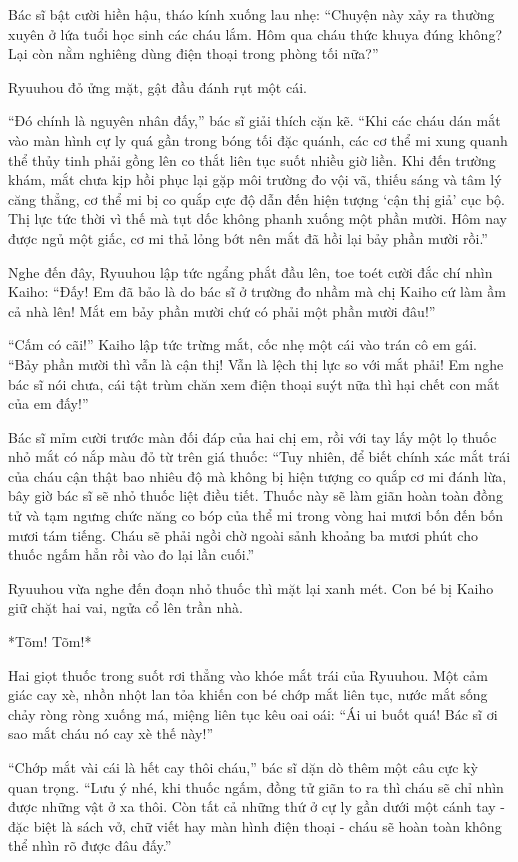 ﻿\documentclass[../main.tex]{subfiles}
\begin{document}
Bác sĩ bật cười hiền hậu, tháo kính xuống lau nhẹ: ``Chuyện này xảy ra thường xuyên ở lứa tuổi học sinh các cháu lắm. Hôm qua cháu thức khuya đúng không? Lại còn nằm nghiêng dùng điện thoại trong phòng tối nữa?''

Ryuuhou đỏ ửng mặt, gật đầu đánh rụt một cái.

``Đó chính là nguyên nhân đấy,'' bác sĩ giải thích cặn kẽ. ``Khi các cháu dán mắt vào màn hình cự ly quá gần trong bóng tối đặc quánh, các cơ thể mi xung quanh thể thủy tinh phải gồng lên co thắt liên tục suốt nhiều giờ liền. Khi đến trường khám, mắt chưa kịp hồi phục lại gặp môi trường đo vội vã, thiếu sáng và tâm lý căng thẳng, cơ thể mi bị co quắp cực độ dẫn đến hiện tượng `cận thị giả' cục bộ. Thị lực tức thời vì thế mà tụt dốc không phanh xuống một phần mười. Hôm nay được ngủ một giấc, cơ mi thả lỏng bớt nên mắt đã hồi lại bảy phần mười rồi.''

Nghe đến đây, Ryuuhou lập tức ngẩng phắt đầu lên, toe toét cười đắc chí nhìn Kaiho: ``Đấy! Em đã bảo là do bác sĩ ở trường đo nhầm mà chị Kaiho cứ làm ầm cả nhà lên! Mắt em bảy phần mười chứ có phải một phần mười đâu!''

``Cấm có cãi!'' Kaiho lập tức trừng mắt, cốc nhẹ một cái vào trán cô em gái. ``Bảy phần mười thì vẫn là cận thị! Vẫn là lệch thị lực so với mắt phải! Em nghe bác sĩ nói chưa, cái tật trùm chăn xem điện thoại suýt nữa thì hại chết con mắt của em đấy!''

Bác sĩ mỉm cười trước màn đối đáp của hai chị em, rồi với tay lấy một lọ thuốc nhỏ mắt có nắp màu đỏ từ trên giá thuốc: ``Tuy nhiên, để biết chính xác mắt trái của cháu cận thật bao nhiêu độ mà không bị hiện tượng co quắp cơ mi đánh lừa, bây giờ bác sĩ sẽ nhỏ thuốc liệt điều tiết. Thuốc này sẽ làm giãn hoàn toàn đồng tử và tạm ngưng chức năng co bóp của thể mi trong vòng hai mươi bốn đến bốn mươi tám tiếng. Cháu sẽ phải ngồi chờ ngoài sảnh khoảng ba mươi phút cho thuốc ngấm hẳn rồi vào đo lại lần cuối.''

Ryuuhou vừa nghe đến đoạn nhỏ thuốc thì mặt lại xanh mét. Con bé bị Kaiho giữ chặt hai vai, ngửa cổ lên trần nhà.

*Tõm! Tõm!*

Hai giọt thuốc trong suốt rơi thẳng vào khóe mắt trái của Ryuuhou. Một cảm giác cay xè, nhồn nhột lan tỏa khiến con bé chớp mắt liên tục, nước mắt sống chảy ròng ròng xuống má, miệng liên tục kêu oai oái: ``Ái ui buốt quá! Bác sĩ ơi sao mắt cháu nó cay xè thế này!''

``Chớp mắt vài cái là hết cay thôi cháu,'' bác sĩ dặn dò thêm một câu cực kỳ quan trọng. ``Lưu ý nhé, khi thuốc ngấm, đồng tử giãn to ra thì cháu sẽ chỉ nhìn được những vật ở xa thôi. Còn tất cả những thứ ở cự ly gần dưới một cánh tay - đặc biệt là sách vở, chữ viết hay màn hình điện thoại - cháu sẽ hoàn toàn không thể nhìn rõ được đâu đấy.''
\end{document}
